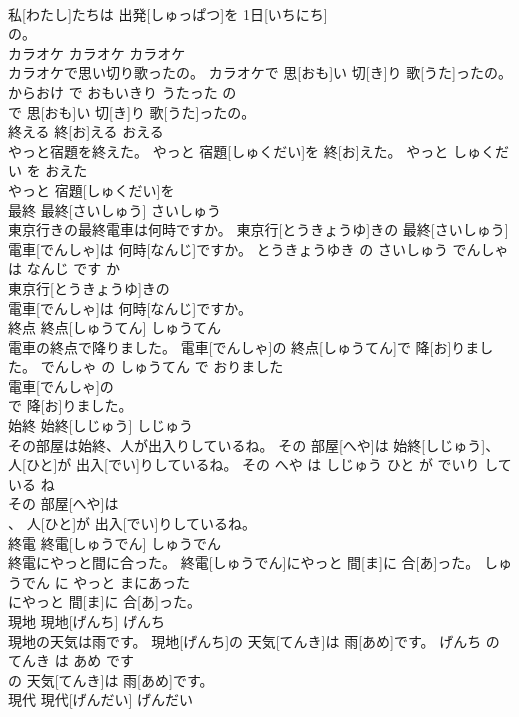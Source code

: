 \documentclass[8pt]{extreport}
\begin{document}
\begin{CJK}{UTF8}{min}
\\	私[わたし]たちは 出発[しゅっぱつ]を 1日[いちにち]
\\	の。			
\\	カラオケ	カラオケ	カラオケ	
\\	カラオケで思い切り歌ったの。	カラオケで 思[おも]い 切[き]り 歌[うた]ったの。	からおけ で おもいきり うたった の	
\\	で 思[おも]い 切[き]り 歌[うた]ったの。			
\\	終える	終[お]える	おえる	
\\	やっと宿題を終えた。	やっと 宿題[しゅくだい]を 終[お]えた。	やっと しゅくだい を おえた	
\\	やっと 宿題[しゅくだい]を
\\	最終	最終[さいしゅう]	さいしゅう	
\\	東京行きの最終電車は何時ですか。	東京行[とうきょうゆ]きの 最終[さいしゅう] 電車[でんしゃ]は 何時[なんじ]ですか。	とうきょうゆき の さいしゅう でんしゃ は なんじ です か	
\\	東京行[とうきょうゆ]きの
\\	電車[でんしゃ]は 何時[なんじ]ですか。			
\\	終点	終点[しゅうてん]	しゅうてん	
\\	電車の終点で降りました。	電車[でんしゃ]の 終点[しゅうてん]で 降[お]りました。	でんしゃ の しゅうてん で おりました	
\\	電車[でんしゃ]の
\\	で 降[お]りました。			
\\	始終	始終[しじゅう]	しじゅう	
\\	その部屋は始終、人が出入りしているね。	その 部屋[へや]は 始終[しじゅう]、 人[ひと]が 出入[でい]りしているね。	その へや は しじゅう ひと が でいり して いる ね	
\\	その 部屋[へや]は
\\	、 人[ひと]が 出入[でい]りしているね。			
\\	終電	終電[しゅうでん]	しゅうでん	
\\	終電にやっと間に合った。	終電[しゅうでん]にやっと 間[ま]に 合[あ]った。	しゅうでん に やっと まにあった	
\\	にやっと 間[ま]に 合[あ]った。			
\\	現地	現地[げんち]	げんち	
\\	現地の天気は雨です。	現地[げんち]の 天気[てんき]は 雨[あめ]です。	げんち の てんき は あめ です	
\\	の 天気[てんき]は 雨[あめ]です。			
\\	現代	現代[げんだい]	げんだい	

\end{CJK}
\end{document}
